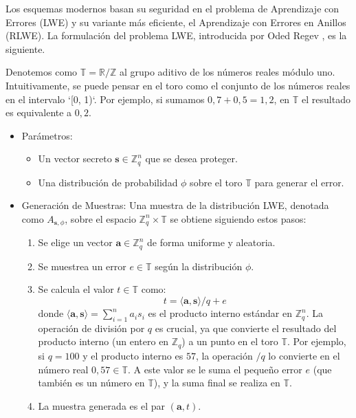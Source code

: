 Los esquemas modernos basan su seguridad en el problema de Aprendizaje con Errores (LWE) y su variante más eficiente, el Aprendizaje con Errores en Anillos (RLWE). La formulación del problema LWE, introducida por Oded Regev \cite{Regev05}, es la siguiente.

Denotemos como $\mathbb{T} = \mathbb{R}/\mathbb{Z}$ al grupo aditivo de los números reales módulo uno. Intuitivamente, se puede pensar en el toro como el conjunto de los números reales en el intervalo `[0, 1)`. Por ejemplo, si sumamos $0{,}7 + 0{,}5 = 1{,}2$, en $\mathbb{T}$ el resultado es equivalente a $0{,}2$.

\begin{itemize}
    \item Parámetros:
    \begin{itemize}
        \item Un vector secreto $\mathbf{s} \in \mathbb{Z}_q^n$ que se desea proteger.
        \item Una distribución de probabilidad $\phi$ sobre el toro $\mathbb{T}$ para generar el error.
    \end{itemize}
    \item Generación de Muestras: Una muestra de la distribución LWE, denotada como $A_{\mathbf{s},\phi}$, sobre el espacio $\mathbb{Z}_q^n \times \mathbb{T}$ se obtiene siguiendo estos pasos:
    \begin{enumerate}
        \item Se elige un vector $\mathbf{a} \in \mathbb{Z}_q^n$ de forma uniforme y aleatoria.
        \item Se muestrea un error $e \in \mathbb{T}$ según la distribución $\phi$.
        \item Se calcula el valor $t \in \mathbb{T}$ como:
        \begin{equation}
            t = \langle \mathbf{a}, \mathbf{s} \rangle / q + e
        \end{equation}
        donde $\langle \mathbf{a}, \mathbf{s} \rangle = \sum_{i=1}^{n} a_i s_i$ es el producto interno estándar en $\mathbb{Z}_q^n$. La operación de división por $q$ es crucial, ya que convierte el resultado del producto interno (un entero en $\mathbb{Z}_q$) a un punto en el toro $\mathbb{T}$. Por ejemplo, si $q=100$ y el producto interno es $57$, la operación $/q$ lo convierte en el número real $0{,}57 \in \mathbb{T}$. A este valor se le suma el pequeño error $e$ (que también es un número en $\mathbb{T}$), y la suma final se realiza en $\mathbb{T}$.
        \item La muestra generada es el par $(\mathbf{a}, t)$.
    \end{enumerate}
\end{itemize}

